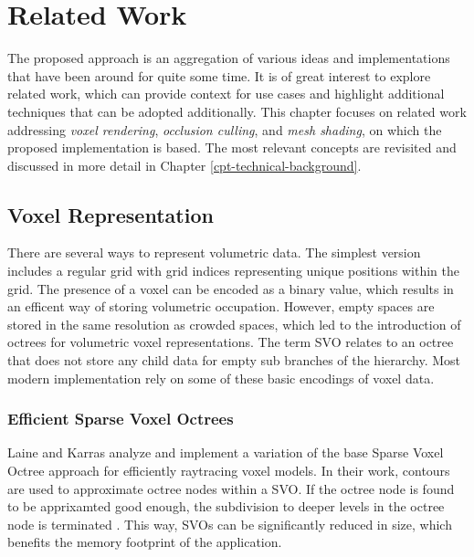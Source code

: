 \chapter{Related Work} \label{cpt-related-work}

The proposed approach is an aggregation of various ideas and implementations that have been 
around for quite some time. It is of great interest to explore related work, which can provide 
context for use cases and highlight additional techniques that can be adopted additionally. 
This chapter focuses on related work addressing \emph{voxel rendering}, \emph{occlusion culling}, 
and \emph{mesh shading}, on which the proposed implementation is based. The most relevant concepts 
are revisited and discussed in more detail in Chapter \ref{cpt-technical-background}. 


\section{Voxel Representation} \label{sec-voxel-representation}

There are several ways to represent volumetric data. The simplest version includes a regular 
grid with grid indices representing unique positions within the grid. The presence of a voxel 
can be encoded as a binary value, which results in an efficent way of storing volumetric occupation.
However, empty spaces are stored in the same resolution as crowded spaces, which led to the 
introduction of octrees for volumetric voxel representations. The term \ac{SVO} relates to an 
octree that does not store any child data for empty sub branches of the hierarchy. Most modern 
implementation rely on some of these basic encodings of voxel data.  


\subsection*{Efficient Sparse Voxel Octrees}

Laine and Karras \cite{Laine2010} analyze and implement a variation of the base Sparse Voxel Octree approach for 
efficiently raytracing voxel models. In their work, contours are used to approximate octree nodes within a \ac{SVO}. If the 
octree node is found to be apprixamted good enough, the subdivision to deeper levels in the octree node is terminated
\cite{Kampe2013,Laine2010}. This way, \ac{SVO}s can be significantly reduced in size, which benefits the memory 
footprint of the application. \\


